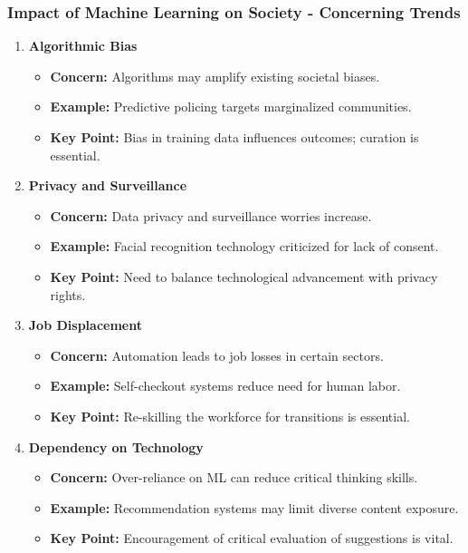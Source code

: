 \documentclass[aspectratio=169]{beamer}
\begin{document}
\begin{frame}[fragile]
    \frametitle{Impact of Machine Learning on Society - Concerning Trends}
    \begin{enumerate}
        \item \textbf{Algorithmic Bias}
        \begin{itemize}
            \item \textbf{Concern:} Algorithms may amplify existing societal biases.
            \item \textbf{Example:} Predictive policing targets marginalized communities.
            \item \textbf{Key Point:} Bias in training data influences outcomes; curation is essential.
        \end{itemize}
        
        \item \textbf{Privacy and Surveillance}
        \begin{itemize}
            \item \textbf{Concern:} Data privacy and surveillance worries increase.
            \item \textbf{Example:} Facial recognition technology criticized for lack of consent.
            \item \textbf{Key Point:} Need to balance technological advancement with privacy rights.
        \end{itemize}
        
        \item \textbf{Job Displacement}
        \begin{itemize}
            \item \textbf{Concern:} Automation leads to job losses in certain sectors.
            \item \textbf{Example:} Self-checkout systems reduce need for human labor.
            \item \textbf{Key Point:} Re-skilling the workforce for transitions is essential.
        \end{itemize}
        
        \item \textbf{Dependency on Technology}
        \begin{itemize}
            \item \textbf{Concern:} Over-reliance on ML can reduce critical thinking skills.
            \item \textbf{Example:} Recommendation systems may limit diverse content exposure.
            \item \textbf{Key Point:} Encouragement of critical evaluation of suggestions is vital.
        \end{itemize}
    \end{enumerate}
\end{frame}
\end{document}
